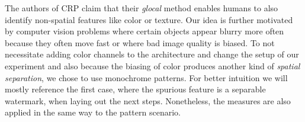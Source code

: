 The authors of CRP claim that their \textit{glocal} method enables humans to also identify non-spatial features like color or texture. Our idea is further motivated by computer vision problems where certain objects appear blurry more often because they often move fast or where bad image quality is biased.
To not necessitate adding color channels to the architecture and change the setup of our experiment and also because the biasing of color produces another kind of \textit{spatial separation}, we chose to use monochrome patterns.
For better intuition we will mostly reference the first case, where the spurious feature is a separable watermark, when laying out the next steps. Nonetheless, the measures are also applied in the same way to the pattern scenario. 

